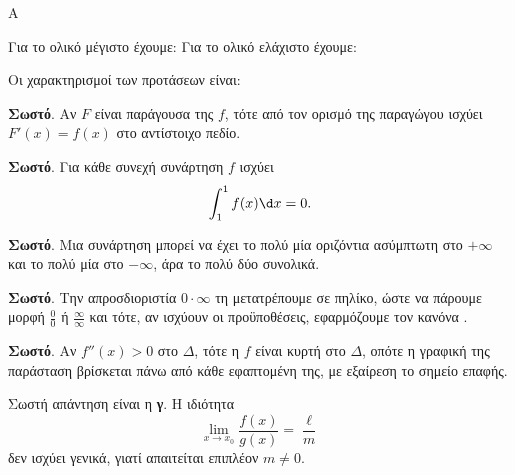 \begin{thema}{Α}
\begin{erwthma}
\item {}

\item {}

\item Για το ολικό μέγιστο έχουμε:
Για το ολικό ελάχιστο έχουμε:

\item Οι χαρακτηρισμοί των προτάσεων είναι:
\begin{alist}
\item \textbf{Σωστό}. Αν $F$ είναι παράγουσα της $f$, τότε από τον ορισμό της παραγώγου ισχύει $F'(x)=f(x)$ στο αντίστοιχο πεδίο.
\item \textbf{Σωστό}. Για κάθε συνεχή συνάρτηση $f$ ισχύει
\[ \dint_1^1 f(x)\d x=0. \]
\item \textbf{Σωστό}. Μια συνάρτηση μπορεί να έχει το πολύ μία οριζόντια ασύμπτωτη στο $+\infty$ και το πολύ μία στο $-\infty$, άρα το πολύ δύο συνολικά.
\item \textbf{Σωστό}. Την απροσδιοριστία $0\cdot\infty$ τη μετατρέπουμε σε πηλίκο, ώστε να πάρουμε μορφή $\frac{0}{0}$ ή $\frac{\infty}{\infty}$ και τότε, αν ισχύουν οι προϋποθέσεις, εφαρμόζουμε τον κανόνα .
\item \textbf{Σωστό}. Αν $f''(x)>0$ στο $\Delta$, τότε η $f$ είναι κυρτή στο $\Delta$, οπότε η γραφική της παράσταση βρίσκεται πάνω από κάθε εφαπτομένη της, με εξαίρεση το σημείο επαφής.
\end{alist}

\item Σωστή απάντηση είναι η \textbf{γ}. Η ιδιότητα
\[ \lim_{x\to x_0}\dfrac{f(x)}{g(x)}=\dfrac{\ell}{m} \]
δεν ισχύει γενικά, γιατί απαιτείται επιπλέον $m\neq0$.
\end{erwthma}
\end{thema}

